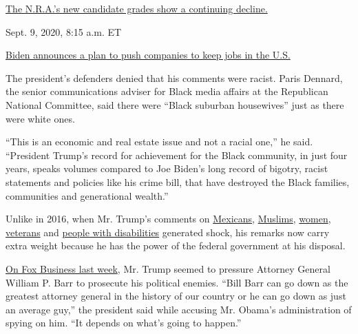 \href{https://www.nytimes3xbfgragh.onion/live/2020/09/09/us/trump-vs-biden\#the-nras-new-candidate-grades-show-a-continuing-decline}{The
N.R.A.'s new candidate grades show a continuing
decline.}\href{https://www.nytimes3xbfgragh.onion/live/2020/09/09/us/trump-vs-biden\#biden-announces-a-plan-to-push-companies-to-keep-jobs-in-the-us}{}

Sept. 9, 2020, 8:15 a.m. ET

\href{https://www.nytimes3xbfgragh.onion/live/2020/09/09/us/trump-vs-biden\#biden-announces-a-plan-to-push-companies-to-keep-jobs-in-the-us}{Biden
announces a plan to push companies to keep jobs in the U.S.}

The president's defenders denied that his comments were racist. Paris
Dennard, the senior communications adviser for Black media affairs at
the Republican National Committee, said there were ``Black suburban
housewives'' just as there were white ones.

``This is an economic and real estate issue and not a racial one,'' he
said. ``President Trump's record for achievement for the Black
community, in just four years, speaks volumes compared to Joe Biden's
long record of bigotry, racist statements and policies like his crime
bill, that have destroyed the Black families, communities and
generational wealth.''

Unlike in 2016, when Mr. Trump's comments on
\href{https://www.nytimes3xbfgragh.onion/2015/06/17/us/politics/donald-trump-runs-for-president-this-time-for-real-he-says.html?hp}{Mexicans},
\href{https://www.nytimes3xbfgragh.onion/politics/first-draft/2015/12/07/donald-trump-calls-for-banning-muslims-from-entering-u-s/}{Muslims},
\href{https://www.nytimes3xbfgragh.onion/2016/10/08/us/politics/donald-trump-women.html}{women},
\href{https://www.nytimes3xbfgragh.onion/2015/07/19/us/politics/trump-belittles-mccains-war-record.html}{veterans}
and
\href{https://www.nytimes3xbfgragh.onion/2015/11/27/us/politics/donald-trump-says-his-mocking-of-new-york-times-reporter-was-misread.html}{people
with disabilities} generated shock, his remarks now carry extra weight
because he has the power of the federal government at his disposal.

\href{https://www.foxnews.com/politics/trump-barr-durham-probe-gauntlet}{On
Fox Business last week}, Mr. Trump seemed to pressure Attorney General
William P. Barr to prosecute his political enemies. ``Bill Barr can go
down as the greatest attorney general in the history of our country or
he can go down as just an average guy,'' the president said while
accusing Mr. Obama's administration of spying on him. ``It depends on
what's going to happen.''

